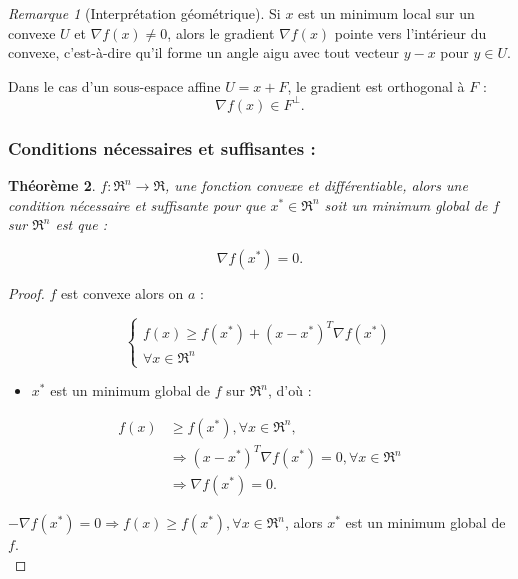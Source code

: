 \documentclass[a4paper,12pt,openany]{book}
\theoremstyle{plain}
\newtheorem{theorem}{Théorème}[section]
\theoremstyle{definition}
\theoremstyle{remark}
\newtheorem{remark}[theorem]{Remarque}
\theoremstyle{nbstyle}
\begin{document}
	\begin{remark}[Interprétation géométrique]
		Si $x$ est un minimum local sur un convexe $U$ et $\nabla f(x) \neq 0$, alors le gradient $\nabla f(x)$ pointe vers l’intérieur du convexe, c’est-à-dire qu’il forme un angle aigu avec tout vecteur $y-x$ pour $y \in U$.  
		
		Dans le cas d’un sous-espace affine $U = x + F$, le gradient est orthogonal à $F$ : 
		\[
		\nabla f(x) \in F^\perp.
		\]
	\end{remark}
	
	\subsubsection{Conditions nécessaires et suffisantes :}
	\begin{theorem} $f: \Re^{n} \rightarrow \Re$, une fonction convexe et différentiable, alors une condition nécessaire et suffisante pour que $x^{*} \in \Re^{n}$ soit un minimum global de $f$ sur $\Re^{n}$ est que :
		
		$$
		\nabla f\left(x^{*}\right)=0 .
		$$
	\end{theorem}
	\begin{proof}
		$f$ est convexe alors on $a$ :
		
		$$
		\left\{\begin{array}{c}
		f(x) \geq f\left(x^{*}\right)+\left(x-x^{*}\right)^{T} \nabla f\left(x^{*}\right) \\
		\forall x \in \Re^{n}
		\end{array}\right.
		$$
		
		\begin{itemize}
			\item $x^{*}$ est un minimum global de $f$ sur $\Re^{n}$, d'où :
		\end{itemize}
		
		$$
		\begin{aligned}
		f(x) & \geq f\left(x^{*}\right), \forall x \in \Re^{n}, \\
		& \Longrightarrow\left(x-x^{*}\right)^{T} \nabla f\left(x^{*}\right)=0, \forall x \in \Re^{n} \\
		& \Longrightarrow \nabla f\left(x^{*}\right)=0 .
		\end{aligned}
		$$
		
		$-\nabla f\left(x^{*}\right)=0 \Longrightarrow f(x) \geq f\left(x^{*}\right), \forall x \in \Re^{n}$, alors $x^{*}$ est un minimum global de $f$.\\
	\end{proof}
	
\end{document}
